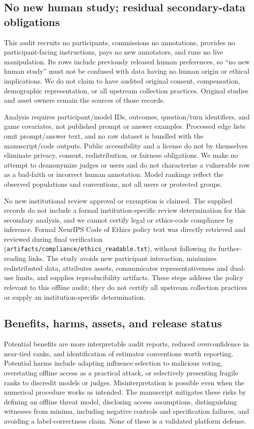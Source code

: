 \subsection{No new human study; residual secondary-data obligations}
This audit recruits no participants, commissions no annotations, provides no participant-facing instructions, pays no new annotators, and runs no live manipulation. Its rows include previously released human preferences, so ``no new human study'' must not be confused with data having no human origin or ethical implications. We do not claim to have audited original consent, compensation, demographic representation, or all upstream collection practices. Original studies and asset owners remain the sources of those records.

Analysis requires participant/model IDs, outcomes, question/turn identifiers, and game covariates, not published prompt or answer examples. Processed edge lists omit prompt/answer text, and no raw dataset is bundled with the manuscript/code outputs. Public accessibility and a license do not by themselves eliminate privacy, consent, redistribution, or fairness obligations. We make no attempt to deanonymize judges or users and do not characterize a vulnerable row as a bad-faith or incorrect human annotation. Model rankings reflect the observed populations and conventions, not all users or protected groups.

No new institutional review approval or exemption is claimed. The supplied records do not include a formal institution-specific review determination for this secondary analysis, and we cannot certify legal or ethics-code compliance by inference. Formal NeurIPS Code of Ethics policy text was directly retrieved and reviewed during final verification (\texttt{artifacts/compliance/ethics\_readable.txt}), without following its further-reading links. The study avoids new participant interaction, minimizes redistributed data, attributes assets, communicates representativeness and dual-use limits, and supplies reproducibility artifacts. These steps address the policy relevant to this offline audit; they do not certify all upstream collection practices or supply an institution-specific determination.

\subsection{Benefits, harms, assets, and release status}
Potential benefits are more interpretable audit reports, reduced overconfidence in near-tied ranks, and identification of estimator conventions worth reporting. Potential harms include adapting influence selection to malicious voting, overstating offline access as a practical attack, or selectively presenting fragile ranks to discredit models or judges. Misinterpretation is possible even when the numerical procedure works as intended. The manuscript mitigates these risks by defining an offline threat model, disclosing access assumptions, distinguishing witnesses from minima, including negative controls and specification failures, and avoiding a label-correctness claim. None of these is a validated platform defense.

